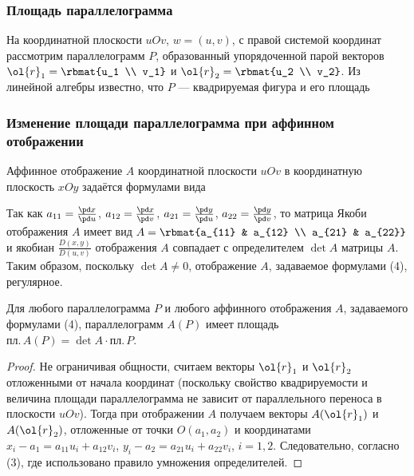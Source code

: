 \documentclass[a4paper]{article}
\begin{document}
\subsubsection{Площадь параллелограмма}

На координатной плоскости $uOv$, $w=(u,v)$, с правой системой
координат рассмотрим параллелограмм $P$, образованный упорядоченной
парой векторов $\ol{r}_1=\rbmat{u_1 \\ v_1}$ и $\ol{r}_2=\rbmat{u_2
\\ v_2}$. Из линейной алгебры известно, что $P$ --- квадрируемая
фигура и его площадь 

\subsubsection{Изменение площади параллелограмма при аффинном
отображении} \label{174}

 Аффинное отображение $A$ координатной
плоскости $uOv$ в координатную плоскость $xOy$ задаётся формулами
вида 

Так как $a_{11}=\frac{\pd x}{\pd u}$, $a_{12}=\frac{\pd x}{\pd v}$,
$a_{21}=\frac{\pd y}{\pd u}$, $a_{22}=\frac{\pd y}{\pd v}$, то
матрица Якоби отображения $A$ имеет вид $A=\rbmat{a_{11} & a_{12} \\
a_{21} & a_{22}}$ и якобиан $\frac{D(x,y)}{D(u,v)}$ отображения $A$
совпадает с определителем $\det A$ матрицы $A$. Таким образом,
поскольку $\det A\ne0$, отображение $A$, задаваемое формулами (4),
регулярное.

\begin{theorem}
\label{thm742} Для любого параллелограмма $P$ и любого аффинного
отображения $A$, задаваемого формулами (4), параллелограмм $A(P)$
имеет площадь $пл.\,A(P)=\det A\cdot пл.\,P$.
\end{theorem}

\begin{proof}
Не ограничивая общности, считаем векторы $\ol{r}_1$ и $\ol{r}_2$
отложенными от начала координат (поскольку свойство квадрируемости и
величина площади параллелограмма не зависит от параллельного
переноса в плоскости $uOv$). Тогда при отображении $A$ получаем
векторы $A(\ol{r}_1)$ и $A(\ol{r}_2)$, отложенные от точки
$O(a_1,a_2)$ и координатами $x_i - a_1 = a_{11}u_i + a_{12}v_i$,
$y_i-a_2 = a_{21} u_i + a_{22} v_i$, $i=1,2$. Следовательно,
согласно (3),  где использовано правило умножения
определителей.
\end{proof}
\end{document}
